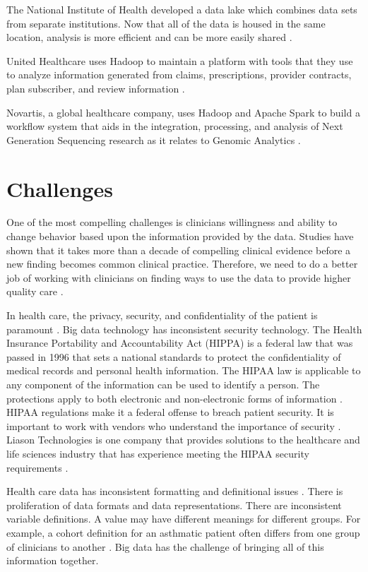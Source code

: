 \documentclass[sigconf]{acmart}
\begin{document}
The National Institute of Health developed a data lake which combines data sets from separate institutions. Now that all of the data is housed in the same location, analysis is more efficient and can be more easily shared \cite{www-google-McDonald}.

United Healthcare uses Hadoop to maintain a platform with tools that they use to analyze information generated from claims, prescriptions, provider contracts, plan subscriber, and review information \cite{www-google-McDonald}.

Novartis, a global healthcare company, uses Hadoop and Apache Spark to build a workflow system that aids in the integration, processing, and analysis of Next Generation Sequencing research as it relates to Genomic Analytics \cite{www-google-McDonald}.


\section{Challenges}
One of the most compelling challenges is clinicians willingness and ability to change behavior based upon the information provided by the data.  Studies have shown that it takes more than a decade of compelling clinical evidence before a new finding becomes common clinical practice. Therefore, we need to do a better job of working with clinicians on finding ways to use the data to provide higher quality care \cite{www-google-hadoop}. 

In health care, the privacy, security, and confidentiality of the patient is paramount \cite{www-google-HlthCat}.  Big data technology has inconsistent security technology.  The Health Insurance Portability and Accountability Act (HIPPA) is a federal law that was passed in 1996 that sets a national standards to protect the confidentiality of medical records and personal health information. The HIPAA law is applicable to any component of the information can be used to identify a person. The protections apply to both electronic and non-electronic forms of information \cite{HIPAA}. HIPAA regulations make it a federal offense to breach patient security. It is important to work with vendors who understand the importance of security \cite{www-google-HlthCat}. Liason Technologies is one company that provides solutions to the healthcare and life sciences industry that has experience meeting the HIPAA security requirements \cite{www-google-McDonald}.
 
Health care data has inconsistent formatting and definitional issues \cite{www-google-hadoop}. There is proliferation of data formats and data representations. There are inconsistent variable definitions. A value may have different meanings for different groups. For example, a cohort definition for an asthmatic patient often differs from one group of clinicians to another \cite{www-google-reas}. Big data has the challenge of bringing all of this information together.  
\end{document}
